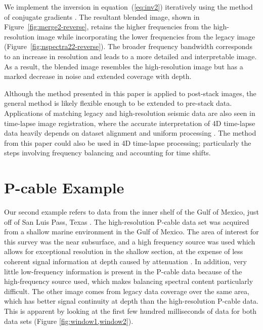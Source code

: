 We implement the inversion in equation~(\ref{eq:inv2}) iteratively using the method of conjugate gradients \cite[]{conjgrad}.
The resultant blended image, shown in Figure~\ref{fig:merge2-reverse}, retains the higher frequencies from the high-resolution image while incorporating the lower frequencies from the legacy image (Figure~\ref{fig:nspectra22-reverse}).
The broader frequency bandwidth corresponds to an increase in resolution and leads to a more detailed and interpretable image.
As a result, the blended image resembles the high-resolution image but has a marked decrease in noise and extended coverage with depth.

Although the method presented in this paper is applied to post-stack images, the general method is likely flexible enough to be extended to pre-stack data.
Applications of matching legacy and high-resolution seismic data are also seen in time-lapse image registration, where the accurate interpretation of 4D time-lapse data heavily depends on dataset alignment and uniform processing \cite[]{nonuniform}.
The method from this paper could also be used in 4D time-lapse processing; particularly the steps involving frequency balancing and accounting for time shifts.

\section{P-cable Example}
Our second example refers to data from the inner shelf of the Gulf of Mexico, just off of San Luis Pass, Texas \cite[]{data}.
The high-resolution P-cable data set was acquired from a shallow marine environment in the Gulf of Mexico.
The area of interest for this survey was the near subsurface, and a high frequency source was used which allows for exceptional resolution in the shallow section, at the expense of less coherent signal information at depth caused by attenuation \cite[]{tip}.
In addition, very little low-frequency information is present in the P-cable data because of the high-frequency source used, which makes balancing spectral content particularly difficult.
The other image comes from legacy data coverage over the same area, which has better signal continuity at depth than the high-resolution P-cable data.
This is apparent by looking at the first few hundred milliseconds of data for both data sets (Figure \ref{fig:window1,window2}).


